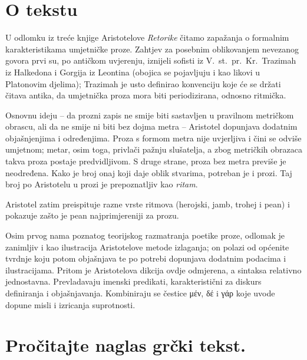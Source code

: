 


\section*{O tekstu}

U odlomku iz treće knjige Aristotelove \textit{Retorike} čitamo zapažanja o formalnim karakteristikama umjetničke proze. Zahtjev za posebnim oblikovanjem nevezanog govora prvi su, po antičkom uvjerenju, iznijeli sofisti iz V.~st.\ pr.~Kr.\ Trazimah iz Halkedona i Gorgija iz Leontina (obojica se pojavljuju i kao likovi u Platonovim djelima); Trazimah je usto definirao konvenciju koje će se držati čitava antika, da umjetnička proza mora biti periodizirana, odnosno ritmička.

Osnovnu ideju – da prozni zapis ne smije biti sastavljen u pravilnom metričkom obrascu, ali da ne smije ni biti bez dojma metra – Aristotel dopunjava dodatnim objašnjenjima i određenjima. Proza s formom metra nije uvjerljiva i čini se odviše umjetnom; metar, osim toga, privlači pažnju slušatelja, a zbog metričkih obrazaca takva proza postaje predvidljivom. S druge strane, proza bez metra previše je neodređena. Kako je broj onaj koji daje oblik stvarima, potreban je i prozi. Taj broj po Aristotelu u prozi je prepoznatljiv kao \textit{ritam}. 

Aristotel zatim preispituje razne vrste ritmova (herojski, jamb, trohej i pean) i pokazuje zašto je pean najprimjereniji za prozu.

Osim prvog nama poznatog teorijskog razmatranja poetike proze, odlomak je zanimljiv i kao ilustracija Aristotelove metode izlaganja; on polazi od općenite tvrdnje koju potom objašnjava te po potrebi dopunjava dodatnim podacima i ilustracijama. Pritom je Aristotelova dikcija ovdje odmjerena, a sintaksa relativno jednostavna. Prevladavaju imenski predikati, karakteristični za diskurs definiranja i objašnjavanja. Kombiniraju se čestice μέν, δέ i γάρ koje uvode dopune misli i izricanja suprotnosti.


\newpage

\section*{Pročitajte naglas grčki tekst.}


